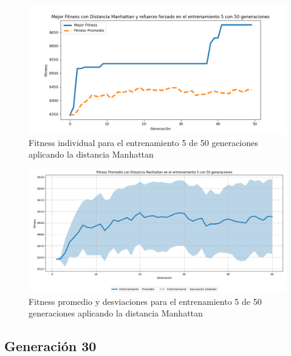 \documentclass[conference]{IEEEtran}
\begin{document}
\begin{figure}[H]
    \centering
    \includegraphics[width=0.9 \linewidth]{Manhattan/Fitness_individual_50Gen/Fitness_5_Manh_50Gen.png}
    \caption{Fitness individual para el entrenamiento 5 de 50 generaciones aplicando la distancia Manhattan}
    \label{fig:manhattan_5_50}
\end{figure}
\begin{figure}[H]
    \centering
    \includegraphics[width=0.9 \linewidth]{Manhattan/Fitness_individual_50Gen/Fitness_5_Manh_50Gen_Sombra.png}
    \caption{Fitness promedio y desviaciones para el entrenamiento 5 de 50 generaciones aplicando la distancia Manhattan}
    \label{fig:manhattan_5_50_sombra}
\end{figure}

\subsection{Generación 30}
\setcounter{figure}{0}
\renewcommand{\thefigure}{S\arabic{figure}B-M}
\end{document}
